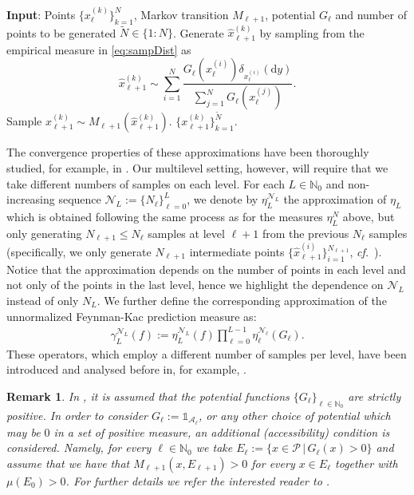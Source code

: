 \documentclass{article}
\newtheorem{remark}[theorem]{Remark}
\newcommand{\cA}{\mathcal{A}}
\newcommand{\cP}{\mathcal{P}}
\newcommand{\cN}{\mathcal{N}}
\newcommand{\IN}{\mathbb{N}}
\newcommand{\bOne}{\mathds{1}}
\renewcommand{\d}{{\text{d}}}
\newcommand{\dy}{{\d y}}
\theoremstyle{definition}
\begin{document}
\begin{algorithm}
  \begin{algorithmic}[1]
    \STATE \textbf{Input}: Points $\{x^{(k)}_{\ell}\}_{k=1}^N$, Markov transition $M_{\ell+1}$, potential $G_\ell$ and number of points to be generated $\widetilde{N}\in\{1:N\}$.
    \STATE Generate $\hat{x}_{\ell+1}^{(k)}$ by sampling from the empirical measure in
    \cref{eq:sampDist} as $$\hat{x}_{\ell+1}^{(k)}\sim \sum\limits_{i=1}^N\frac{G_{\ell}(x_{\ell}^{(i)})\delta_{x_{\ell}^{(i)}}(\dy)}{\sum_{j=1}^NG_{\ell}(x_{\ell}^{(j)})}.$$
    \STATE Sample ${x}_{\ell+1}^{(k)} \sim M_{\ell+1}(\hat{x}_{\ell+1}^{(k)})$.
    \ENDFOR
    \RETURN $\{{x}_{\ell+1}^{(k)}\}_{k=1}^{\widetilde{N}}$.
  \end{algorithmic}
  \caption{Generation of the samples for the approximation of $\eta_{\ell+1}$ given the samples for the approximation of $\eta_\ell$.}
  \label{alg:sample}
\end{algorithm}
The convergence properties of these approximations have been thoroughly studied, for example, in
\cite{cerouSequentialMonteCarlo2012,cerouNonasymptoticTheoremUnnormalized2011,DelMoralFeynmanKac2004}.
Our multilevel setting, however, will require that we take different numbers of samples on each level. For each $L\in\IN_0$
and non-increasing sequence $\cN_L:=\{N_\ell\}_{\ell = 0}^L$, we denote by $\eta^{\cN_L}_L$ the approximation of $\eta_L$
which is obtained following the same process as for the measures $\eta^N_L$ above, but only generating
$N_{\ell+1}\leq N_{\ell}$ samples at level $\ell+1$ from the previous $N_\ell$ samples (specifically, we only generate
$N_{\ell+1}$ intermediate points $\{\hat{x}^{(i)}_{\ell+1}\}_{i=1}^{N_{\ell+1}}$, \emph{cf.}~).
Notice that the approximation depends on the number of points in each level and not only of the points in the last
level, hence we highlight the dependence on $\mathcal{N}_L$ instead of only $N_L$. We further define the corresponding
approximation of the unnormalized Feynman-Kac prediction measure as:
\begin{align*}
  \gamma_L^{\cN_L}(f):= \eta_L^{\cN_L}(f)\prod\limits_{\ell=0}^{L-1}\eta_\ell^{\cN_\ell}(G_\ell).
\end{align*}
These operators, which employ a different number of samples per level, have been
  introduced and analysed before in, for example, \cite{beskosMultilevelSequentialMonte2017,moralMultilevelSequentialMonte2017}.

\begin{remark}\label{rmk:acc}
    In \cite{DelMoralFeynmanKac2004}, it is assumed that the potential functions $\{G_\ell\}_{\ell\in\IN_0}$ are strictly positive.
    In order to consider $G_\ell:=\bOne_{\cA_\ell}$, or any other choice of potential which may be $0$ in a set of positive measure,
    an additional (accessibility) condition is considered. Namely, for every $\ell\in\IN_0$ we take $E_\ell:=\{x\in\cP\,\vert\,G_\ell(x)>0\}$
    and assume that we have that $M_{\ell+1}(x,E_{\ell+1})>0$ for every $x\in E_\ell$ together with $\mu(E_0)>0$.
    For further details we refer the interested reader to \cite[Sec.~2.4.3]{DelMoralFeynmanKac2004}.
\end{remark}
\end{document}

